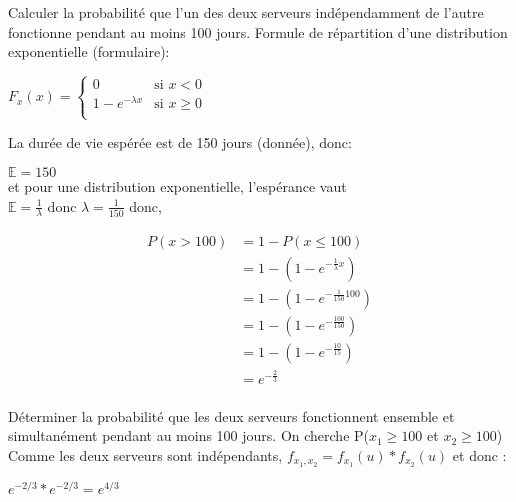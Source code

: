
\begin{exo}
 
 \begin{subexo}{Calculer la probabilité que l’un des deux serveurs indépendamment de l’autre fonctionne pendant au moins 100 jours.}
 	Formule de répartition d'une distribution exponentielle (formulaire):
 		\begin{center}
 		$ F_x(x) =\begin{cases}
 		0 & \text{si $x < 0$} \\
 		1 - e^{-\lambda x} & \text{si $x \geq 0$} \\
 		\end{cases}$
 		\end{center}
 	La durée de vie espérée est de 150 jours (donnée), donc: 
 		\begin{center}
 			$\mathbb{E} = 150$ \\ 
 			et 	pour une distribution exponentielle, l'espérance vaut \\ 
 			$\mathbb{E} = \frac{1}{\lambda}$ donc $\lambda = \frac{1}{150}$ donc, 
 			
 			\begin{align*}
 			P(x > 100) &= 1 - P(x \le 100) \\
 			&= 1 - (1 - e^{-\frac{1}{\lambda}x})  \\
 			&= 1 - (1 - e^{-\frac{1}{150}100})  \\
 			&= 1 - (1 - e^{-\frac{100}{150}})  \\
 			&= 1 - (1 - e^{-\frac{10}{15}})  \\
 			&= e^{-\frac{2}{3}}  \\
 			\end{align*}
 		\end{center}
 \end{subexo}
  \begin{subexo}{Déterminer la probabilité que les deux serveurs fonctionnent ensemble et simultanément pendant au moins 100 jours.}
  	On cherche P($x_1 \geq 100$ et $x_2  \geq 100$) \\
  	Comme les deux serveurs sont indépendants, $f_{x_1,x_2} = f_{x_1}(u)*f_{x_2}(u)$ et donc :\\
		\begin{center}
			$e^{-2/3} * e^{-2/3} = e^{4/3}$
		\end{center}
  \end{subexo}
\end{exo}
